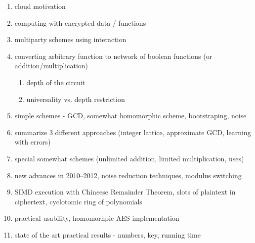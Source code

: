 \documentclass[11pt,oneside,final]{fithesis2}
\begin{document}
    \begin{enumerate}
     \item cloud motivation
     \item computing with encrypted data / functions
     \item multiparty schemes using interaction
     \item converting arbitrary function to network of boolean functions (or addition/multiplication)
	\begin{enumerate}
	 \item depth of the circuit
	 \item universality vs. depth restriction
	\end{enumerate}
    
%
    
    
     \item simple schemes - GCD, somewhat homomorphic scheme, bootstraping, noise
     \item summarize 3 different approaches (integer lattice, approximate GCD, learning with errors)
     \item special somewhat schemes (unlimited addition, limited multiplication, uses)
     \item new advances in 2010--2012, noise reduction techniques, modulus switching
     \item SIMD execution with Chineese Remainder Theorem, slots of plaintext in ciphertext, cyclotomic ring of polynomials
     \item practical usability, homomorhpic AES implementation
     \item state of the art practical results - numbers, key, running time
    \end{enumerate}
\end{document}

